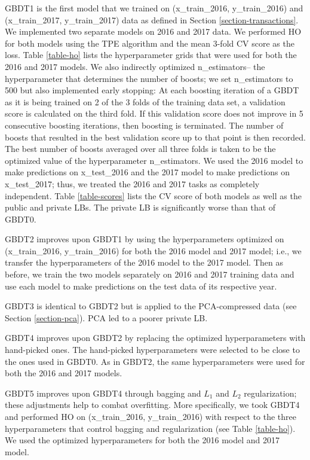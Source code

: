 \documentclass[12pt]{article}
\begin{document}
GBDT1 is the first model that we trained on (x\_train\_2016, y\_train\_2016) and (x\_train\_2017, y\_train\_2017) data as defined in Section \ref{section-transactions}. We implemented two separate models on 2016 and 2017 data. We performed HO for both models using the TPE algorithm and the mean 3-fold CV score as the loss. Table \ref{table-ho} lists the hyperparameter grids that were used for both the 2016 and 2017 models. We also indirectly optimized n\_estimators-- the hyperparameter that determines the number of boosts; we set n\_estimators to 500 but also implemented early stopping: At each boosting iteration of a GBDT as it is being trained on 2 of the 3 folds of the training data set, a validation score is calculated on the third fold. If this validation score does not improve in 5 consecutive boosting iterations, then boosting is terminated. The number of boosts that resulted in the best validation score up to that point is then recorded. The best number of boosts averaged over all three folds is taken to be the optimized value of the hyperparameter n\_estimators. We used the 2016 model to make predictions on x\_test\_2016 and the 2017 model to make predictions on x\_test\_2017; thus, we treated the 2016 and 2017 tasks as completely independent. Table \ref{table-scores} lists the CV score of both models as well as the public and private LBs. The private LB is significantly worse than that of GBDT0.

GBDT2 improves upon GBDT1 by using the hyperparameters optimized on (x\_train\_2016, y\_train\_2016) for both the 2016 model and 2017 model; i.e., we transfer the hyperparameters of the 2016 model to the 2017 model. Then as before, we train the two models separately on 2016 and 2017 training data and use each model to make predictions on the test data of its respective year.

GBDT3 is identical to GBDT2 but is applied to the PCA-compressed data (see Section \ref{section-pca}). PCA led to a poorer private LB.

GBDT4 improves upon GBDT2 by replacing the optimized hyperparameters with hand-picked ones. The hand-picked hyperparameters were selected to be close to the ones used in GBDT0. As in GBDT2, the same hyperparameters were used for both the 2016 and 2017 models.

GBDT5 improves upon GBDT4 through bagging and $L_1$ and $L_2$ regularization; these adjustments help to combat overfitting. More specifically, we took GBDT4 and performed HO on (x\_train\_2016, y\_train\_2016) with respect to the three hyperparameters that control bagging and regularization (see Table \ref{table-ho}). We used the optimized hyperparameters for both the 2016 model and 2017 model.
\end{document}
